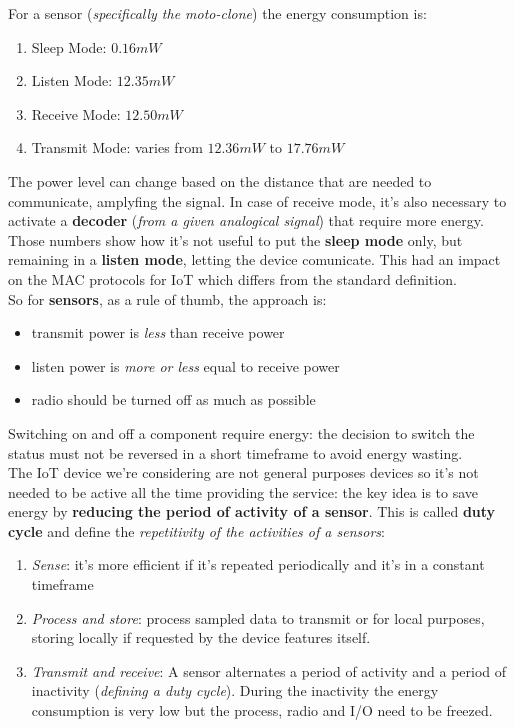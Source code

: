 \documentclass[10pt,a4paper]{report}
\theoremstyle{definition}
\begin{document}
For a sensor (\textit{specifically the moto-clone}) the energy consumption is:
\begin{enumerate}
	\item 
	Sleep Mode:  $0.16mW$
	\item 
	Listen Mode:  $12.35 mW$
	\item 
	Receive Mode: $12.50mW$
	\item 
	Transmit Mode: varies from $12.36 mW$ to $17.76 mW$

\end{enumerate}
	The power level can change based on the distance that are needed to communicate, amplyfing the signal. In case of receive mode, it's also necessary to activate a \textbf{decoder} (\textit{from a given analogical signal}) that require more energy. Those numbers show how it's not useful to put the \textbf{sleep mode} only, but remaining in a \textbf{listen mode}, letting the device comunicate.
This had an impact on the MAC protocols for IoT which differs from the standard definition.\\
So for \textbf{sensors}, as a rule of thumb, the approach is:
\begin{itemize}
	\item 
	transmit power is \textit{less} than receive power
	\item 
	listen power is \textit{more or less} equal to receive power
	\item 
	radio should be turned off as much as possible
	
\end{itemize}
Switching on and off a component require energy: the decision to switch the status must not be reversed in a short timeframe to avoid energy wasting.\\
The IoT device we're considering are not general purposes devices so it's not needed to be active all the time providing the service: the key idea is to save energy by \textbf{reducing the period of activity of a sensor}. This is called \textbf{duty cycle} and define the \textit{repetitivity of the activities of a sensors}:
\begin{enumerate}
	\item 
	\textit{Sense}: it's more efficient if it's repeated periodically and it's in a constant timeframe
	\item 
	\textit{Process and store}: process sampled data to transmit or for local purposes, storing locally if requested by the device features itself.
	\item 
	\textit{Transmit and receive}: A sensor alternates a period of activity and a period of inactivity (\textit{defining a duty cycle}). During the inactivity the energy consumption is very low but the process, radio and I/O need to be freezed.
	
\end{enumerate}
\end{document}
